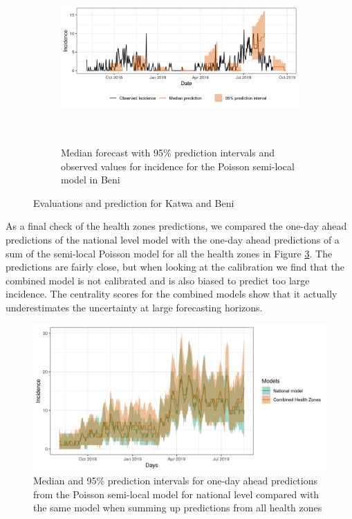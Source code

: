 \documentclass[12pt]{article}
\begin{document}
\begin{figure}[h!]
\begin{subfigure}{\textwidth} 
  \centering
  \includegraphics[width=0.9\linewidth, height=6.6cm]{../output/Beni_predictions.png}
  \caption{ Median forecast with 95\% prediction intervals and observed values for incidence for the Poisson semi-local model in Beni}
  \label{fig:beni_katwa_4}
\end{subfigure}
\caption{Evaluations and prediction for Katwa and Beni}


\label{fig:beni_katwa}
\end{figure}
As a final check of the health zones predictions, we compared the one-day ahead predictions of the national level model with the one-day ahead predictions of a sum of the semi-local Poisson model for all the health zones in Figure \ref{fig:nat_nat_comb}. The predictions are fairly close, but when looking at the  calibration we find that the combined model is not calibrated and is also biased to predict too large incidence. The centrality scores for the combined models show that it actually underestimates the uncertainty at large forecasting horizons. 

\begin{figure}[h!]
  \centering
  \includegraphics[width=0.9\linewidth]{../output/nat_combined.png}
  \caption{Median and 95\% prediction intervals for one-day ahead predictions from the Poisson semi-local model for national level compared with the same model when summing up predictions from all health zones}
  \label{fig:nat_nat_comb}
  
\end{figure}
\end{document}
